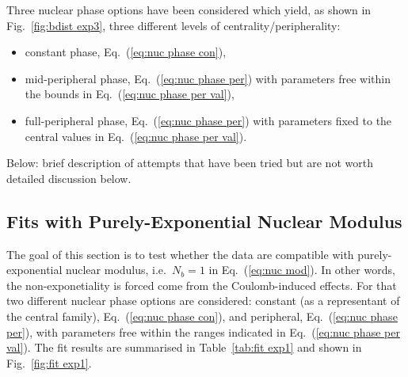 Three nuclear phase options have been considered which yield, as shown in Fig.~\ref{fig:bdist exp3}, three different levels of centrality/peripherality:
\begin{itemize}\setlength\itemsep{0pt}
\item constant phase, Eq.~(\ref{eq:nuc phase con}),
\item mid-peripheral phase, Eq.~(\ref{eq:nuc phase per}) with parameters free within the bounds in Eq.~(\ref{eq:nuc phase per val}),
\item full-peripheral phase, Eq.~(\ref{eq:nuc phase per}) with parameters fixed to the central values in Eq.~(\ref{eq:nuc phase per val}).
\end{itemize}

Below: brief description of attempts that have been tried but are not worth detailed discussion below.








\subsection{Fits with Purely-Exponential Nuclear Modulus}
\label{sec:fit exp1}

The goal of this section is to test whether the data are compatible with purely-exponential nuclear modulus, i.e.~$N_b=1$ in Eq.~(\ref{eq:nuc mod}). In other words, the non-exponetiality is forced come from the Coulomb-induced effects. For that two different nuclear phase options are considered: constant (as a representant of the central family), Eq.~(\ref{eq:nuc phase con}), and peripheral, Eq.~(\ref{eq:nuc phase per}), with parameters free within the ranges indicated in Eq.~(\ref{eq:nuc phase per val}). The fit results are summarised in Table~\ref{tab:fit exp1} and shown in Fig.~\ref{fig:fit exp1}.

